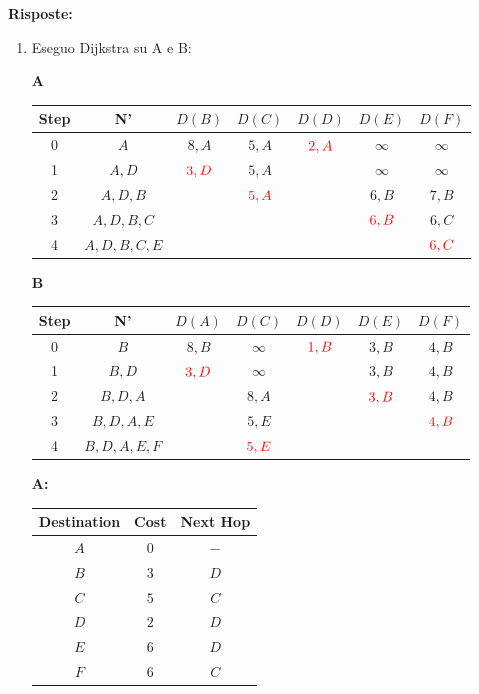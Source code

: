 \documentclass[10pt]{article}
\begin{document}
			\textbf{Risposte:}
			\begin{enumerate}
				\item Eseguo Dijkstra su A e B:
					\begin{center}
						\textbf{A}
						\begin{tabular}{||c c c c c c c||} 
							\hline
							Step & N' & $D(B)$ & $D(C)$ & $D(D)$ & $D(E)$ & $D(F)$ \\[0.5ex] 
							\hline\hline
							0 & $A$ & $8,A$ & $5,A$ & $\color{red} 2,A$ & $\infty$ & $\infty$ \\
							\hline
							1 & $A,D$ & $\color{red} 3,D$ & $5,A$ & & $\infty$ & $\infty$ \\
							\hline
							2 & $A,D,B$ & & $\color{red} 5,A$ & & $6,B$ & $7,B$  \\
							\hline
							3 & $A,D,B,C$ & & & & $\color{red} 6,B$ & $6,C$ \\
							\hline
							4 & $A,D,B,C,E$ & & & &  & $\color{red} 6,C$ \\[0.5ex] 
							\hline
						\end{tabular}
					\end{center}
					\begin{center}
						\textbf{B}
						\begin{tabular}{||c c c c c c c||} 
							\hline
							Step & N' & $D(A)$ & $D(C)$ & $D(D)$ & $D(E)$ & $D(F)$ \\[0.5ex] 
							\hline\hline
							0 & $B$ & $8,B$ & $\infty$ & $\color{red} 1,B$ & $3,B$ & $4,B$ \\
							\hline
							1 & $B,D$ & $\color{red} 3,D$ & $\infty$ & & $3,B$ & $4,B$\\
							\hline
							2 & $B,D,A$ & & $8,A$ & & $\color{red} 3,B$ & $4,B$ \\
							\hline
							3 & $B,D,A,E$ & & $5,E$ & & & $\color{red} 4,B$ \\
							\hline
							4 & $B,D,A,E,F$ & & $\color{red} 5,E$ & & & \\[0.5ex] 
							\hline
						\end{tabular}
					\end{center}
					\begin{center}
						\textbf{A:}
						\begin{tabular}{||c || c || c||}
							\hline
							Destination & Cost & Next Hop \\[0.5ex] 
							\hline\hline
							$A$ & $0$ & $-$ \\
							$B$ & $3$ & $D$ \\
							$C$ & $5$ & $C$ \\
							$D$ & $2$ & $D$ \\
							$E$ & $6$ & $D$ \\
							$F$ & $6$ & $C$ \\[0.5ex] 
							\hline
						\end{tabular}


\end{center}
\end{enumerate}
\end{document}
